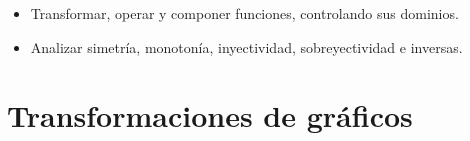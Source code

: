 \documentclass[10pt,a5paper]{article}
\begin{document}

\begin{objetivos}
\begin{itemize}
  \item Transformar, operar y componer funciones, controlando sus dominios.
  \item Analizar simetría, monotonía, inyectividad, sobreyectividad e inversas.
\end{itemize}
\end{objetivos}


\section*{Transformaciones de gráficos}
\end{document}
